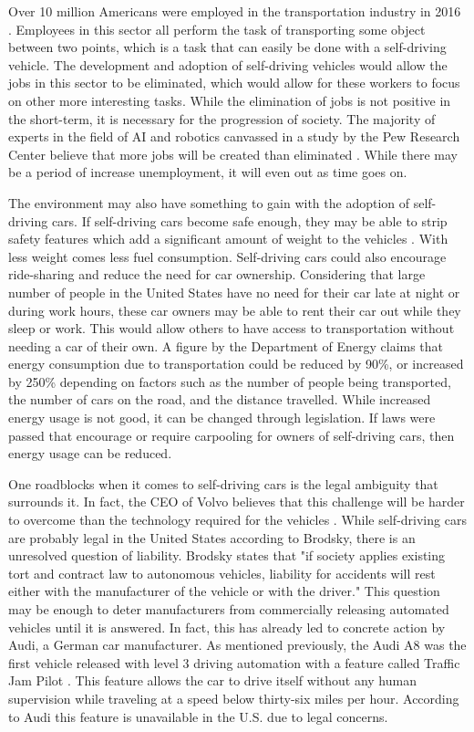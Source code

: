 \documentclass{mla}
\begin{document}
Over 10 million Americans were employed in the transportation industry in 2016 \cite{BTS2018}. Employees in this sector all perform the task of transporting some object between two points, which is a task that can easily be done with a self-driving vehicle. The development and adoption of self-driving vehicles would allow the jobs in this sector to be eliminated, which would allow for these workers to focus on other more interesting tasks. While the elimination of jobs is not positive in the short-term, it is necessary for the progression of society. The majority of experts in the field of AI and robotics canvassed in a study by the Pew Research Center believe that more jobs will be created than eliminated \cite{Smith2014}. While there may be a period of increase unemployment, it will even out as time goes on.

The environment may also have something to gain with the adoption of self-driving cars. If self-driving cars become safe enough, they may be able to strip safety features which add a significant amount of weight to the vehicles \cite{Worland2016}. With less weight comes less fuel consumption. Self-driving cars could also encourage ride-sharing and reduce the need for car ownership. Considering that large number of people in the United States have no need for their car late at night or during work hours, these car owners may be able to rent their car out while they sleep or work. This would allow others to have access to transportation without needing a car of their own. A figure by the Department of Energy claims that energy consumption due to transportation could be reduced by 90\%, or increased by 250\% depending on factors such as the number of people being transported, the number of cars on the road, and the distance travelled. While increased energy usage is not good, it can be changed through legislation. If laws were passed that encourage or require carpooling for owners of self-driving cars, then energy usage can be reduced.

One roadblocks when it comes to self-driving cars is the legal ambiguity that surrounds it. In fact, the CEO of Volvo believes that this challenge will be harder to overcome than the technology required for the vehicles \cite{Brodsky2016}. While self-driving cars are probably legal in the United States according to Brodsky, there is an unresolved question of liability. Brodsky states that "if society applies existing tort and contract law to autonomous vehicles, liability for accidents will rest either with the manufacturer of the vehicle or with the driver." This question may be enough to deter manufacturers from commercially releasing automated vehicles until it is answered. In fact, this has already led to concrete action by Audi, a German car manufacturer. As mentioned previously, the Audi A8 was the first vehicle released with level 3 driving automation with a feature called Traffic Jam Pilot \cite{Davies2018}. This feature allows the car to drive itself without any human supervision while traveling at a speed below thirty-six miles per hour. According to Audi this feature is unavailable in the U.S. due to legal concerns.
\end{document}
